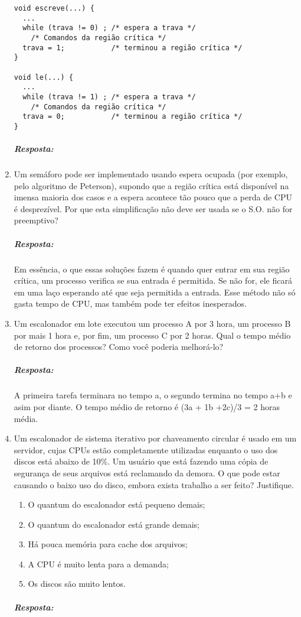 \documentclass[12pt]{article}
\begin{document}
\begin{enumerate}
\begin{verbatim}
void escreve(...) {
  ...
  while (trava != 0) ; /* espera a trava */
    /* Comandos da região crítica */
  trava = 1;           /* terminou a região crítica */
}

void le(...) {
  ...
  while (trava != 1) ; /* espera a trava */
    /* Comandos da região crítica */
  trava = 0;           /* terminou a região crítica */
}
\end{verbatim}
 \subparagraph{Resposta:}
\item
Um semáforo pode ser implementado usando espera ocupada (por exemplo,
pelo algoritmo de Peterson), supondo que a região crítica está
disponível na imensa maioria dos casos e a espera acontece tão pouco
que a perda de CPU é desprezível. Por que esta simplificação não deve
ser usada se o S.O. não for preemptivo?
 \subparagraph{Resposta:}
  Em essência, o que essas soluções fazem é quando quer entrar em sua região crítica, um processo verifica se sua entrada é permitida. Se não for, ele ficará em uma laço esperando até que seja permitida a entrada. Esse método não só gasta tempo de CPU, mas também pode ter efeitos inesperados.
  
\item
Um escalonador em lote executou um processo A por 3 hora, um processo
B por mais 1 hora e, por fim, um processo C por 2 horas. Qual o tempo
médio de retorno dos processos? Como você poderia melhorá-lo?
 \subparagraph{Resposta:}
 A primeira tarefa terminara no tempo a, o segundo termina no tempo a+b e asim por diante. O tempo médio de retorno é (3a + 1b +2c)/3 = 2 horas média.  
 
\item
Um escalonador de sistema iterativo por chaveamento circular é usado
em um servidor, cujas CPUs estão completamente utilizadas enquanto o
uso dos discos está abaixo de 10\%. Um usuário que está fazendo uma
cópia de segurança de seus arquivos está reclamando da demora. O que
pode estar causando o baixo uso do disco, embora exista trabalho a ser
feito? Justifique.
\begin{enumerate}
\item O quantum do escalonador está pequeno demais;
\item O quantum do escalonador está grande demais;
\item Há pouca memória para cache dos arquivos;
\item A CPU é muito lenta para a demanda;
\item Os discos são muito lentos.
\end{enumerate}
 \subparagraph{Resposta:}
 

\end{enumerate}
\end{document}
